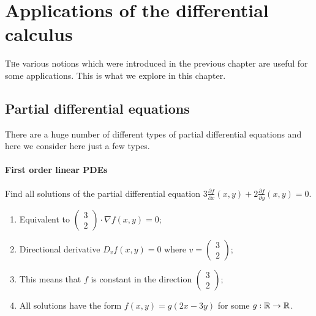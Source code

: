 \chapter{Applications of the differential calculus}

\lettrine{T}{h}e various notions which were introduced in the previous chapter are useful for some applications.
This is what we explore in this chapter.


\section{Partial differential equations}

There are a huge number of different types of partial differential equations and here we consider here just a few types.

\subsubsection*{First order linear PDEs}


\begin{example*}
    Find all solutions of the partial differential equation
    \(3 \frac{\partial f}{\partial x}(x,y) + 2 \frac{\partial f}{\partial y} (x,y) = 0\).

    \solution
    \begin{enumerate}
        \item Equivalent to
              \(\left( \begin{smallmatrix}
                  3 \\ 2
              \end{smallmatrix} \right)
              \cdot
              \nabla f(x,y) =0\);
        \item Directional derivative \( D_{v}f(x,y) = 0\) where \(v=\left( \begin{smallmatrix}
                      3 \\ 2
                  \end{smallmatrix} \right)\);
        \item This means that \(f\) is constant in the direction \(\left( \begin{smallmatrix}
                  3 \\ 2
              \end{smallmatrix} \right)\);
        \item All solutions have the form \(f(x,y) = g(2x-3y)\) for some \(g:\mathbb{R} \to \mathbb{R}\).
    \end{enumerate}
\end{example*}



